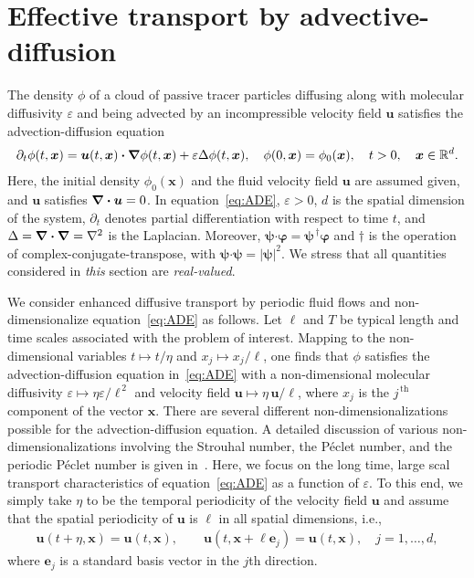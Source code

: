 \documentclass[leqno,onefignum,onetabnum]{siamltex1213}
\newcommand\bnabla{\mbox{\boldmath${\nabla}$}}
\providecommand\bcdot{\boldsymbol{\cdot}}
\newcommand{\vecx}{\boldsymbol{x}}
\newcommand{\vecu}{\boldsymbol{u}}
\newcommand{\vece}{\boldsymbol{e}}
\newcommand{\vecpsi}{\boldsymbol{\psi}}
\newcommand{\vecvarphi}{\boldsymbol{\varphi}}
\begin{document}
\section{Effective transport by
  advective-diffusion} \label{sec:Eff_Trans}    
%
The density $\phi$ of a cloud of passive tracer particles diffusing along
with molecular diffusivity $\varepsilon$ and being advected by an incompressible
velocity field $\vecu$ satisfies the advection-diffusion equation
%
\begin{align}\label{eq:ADE}
  \partial_t\phi(t,\vecx)
    =\vecu (t,\vecx)\bcdot\bnabla \phi(t,\vecx)+\varepsilon\Delta \phi(t,\vecx),
  \quad
  \phi(0,\vecx)=\phi_0(\vecx),  
  \quad
  t>0,
  \quad
  \vecx\in\mathbb{R}^d.
\end{align}
%
Here, the initial density $\phi_0(\vecx)$ and the fluid velocity field
$\vecu$ are assumed given, and $\vecu$ satisfies $\bnabla\bcdot\vecu=0$.
In equation~\eqref{eq:ADE}, $\varepsilon>0$, $d$ is the spatial dimension of the
system, $\partial_t$ denotes partial differentiation with respect to time
$t$, and $\Delta=\bnabla\bcdot\bnabla =\nabla^2$ is the Laplacian. Moreover, 
$\vecpsi\bcdot\vecvarphi=\vecpsi^{\,\dagger}\vecvarphi$ and $\dagger$ is the
operation of complex-conjugate-transpose, with
$\vecpsi\bcdot\vecpsi=|\vecpsi|^2$. We stress that all quantities 
considered in \emph{this} section are \emph{real-valued}. 




We consider enhanced diffusive transport by periodic fluid flows and
non-dimensionalize equation~\eqref{eq:ADE} as follows. Let $\ell$ and 
$T$ be typical length and time scales associated with the problem of
interest. Mapping to the non-dimensional variables
$t\mapsto t/\eta$ and $x_j\mapsto x_j/\ell$,
one finds that $\phi$ satisfies the advection-diffusion equation
in~\eqref{eq:ADE} with a non-dimensional molecular diffusivity 
$\varepsilon\mapsto \eta\varepsilon/\ell^{\,2}$ and velocity field $\vecu\mapsto \eta\,\vecu /\ell$,
where $x_j$ is the $j^{\,\text{th}}$ component of the vector
$\vecx$. There are several different non-dimensionalizations possible
for the advection-diffusion equation. A detailed discussion of 
various non-dimensionalizations involving the Strouhal number, the
P\'{e}clet number, and the periodic P\'{e}clet number is given
in~\cite{McLaughlin:Forest:PF:1999:880}.  Here, we focus on the long
time, large scal transport characteristics of equation~\eqref{eq:ADE}
as a function of $\varepsilon$. To this end, we simply take $\eta$ to be the
temporal periodicity of the velocity field $\vecu$ and assume that the
spatial periodicity of $\vecu$ is $\ell$ in all spatial dimensions, i.e.,
%
\begin{align}\label{eq:Periodic_u}
  \vecu(t+\eta,\vecx)=\vecu(t,\vecx), \qquad
  \vecu(t,\vecx+\ell\vece_j)=\vecu(t,\vecx), \quad
  j=1,\ldots,d,
\end{align}
%
where $\vece_j$ is a standard basis vector in the $j$th direction. 
\end{document}
